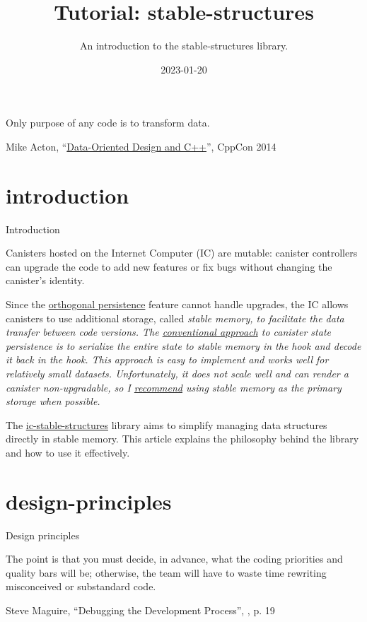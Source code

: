 \documentclass{article}
\title{Tutorial: stable-structures}
\subtitle{An introduction to the stable-structures library.}
\date{2023-01-20}
\begin{document}
\epigraph{
  Only purpose of any code is to transform data.
}{Mike Acton, ``\href{https://youtu.be/rX0ItVEVjHc?t=1360}{Data-Oriented Design and C++}'', CppCon 2014}

\section{introduction}{Introduction}

Canisters hosted on the Internet Computer (IC) are mutable: canister controllers can upgrade the code to add new features or fix bugs without changing the canister's identity.

Since the \href{/posts/06-ic-orthogonal-persistence.html#upgrades}{orthogonal persistence} feature cannot handle upgrades, the IC allows canisters to use additional storage, called \em{stable memory}, to facilitate the data transfer between code versions.
The \href{/posts/11-ii-stable-memory.html#conventional-memory-management}{conventional approach} to canister state persistence is to serialize the entire state to stable memory in the  hook and decode it back in the  hook.
This approach is easy to implement and works well for relatively small datasets.
Unfortunately, it does not scale well and can render a canister non-upgradable, so I \href{/posts/01-effective-rust-canisters.html#stable-memory-main}{recommend} using stable memory as the primary storage when possible.


The \href{https://github.com/dfinity/stable-structures}{ic-stable-structures} library aims to simplify managing data structures directly in stable memory.
This article explains the philosophy behind the library and how to use it effectively.

\section{design-principles}{Design principles}
\epigraph{
    The point is that you must decide, in advance, what the coding priorities and quality bars will be; otherwise, the team will have to waste time rewriting misconceived or substandard code.
}{Steve Maguire, ``Debugging the Development Process'', , p. 19}
\end{document}
